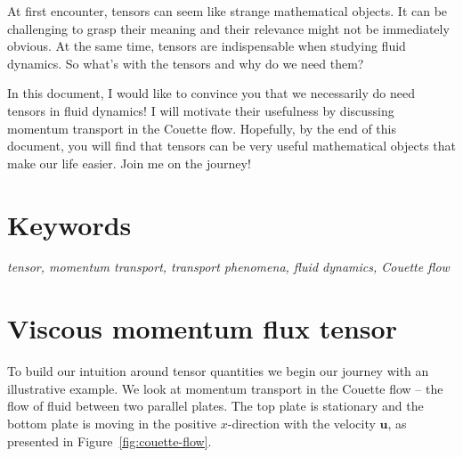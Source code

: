 \documentclass[10pt,twocolumn]{article}
\begin{document}
\small

At first encounter, tensors can seem like strange mathematical objects. It can be challenging to grasp their meaning and their relevance might not be immediately obvious. At the same time, tensors are indispensable when studying fluid dynamics. So what's with the tensors and why do we need them?

In this document, I would like to convince you that we necessarily do need tensors in fluid dynamics! I will motivate their usefulness by discussing momentum transport in the Couette flow. Hopefully, by the end of this document, you will find that tensors can be very useful mathematical objects that make our life easier. Join me on the journey!

\section*{Keywords}

\textit{tensor, momentum transport, transport phenomena, fluid dynamics, Couette flow}


\section*{Viscous momentum flux tensor}

To build our intuition around tensor quantities we begin our journey with an illustrative example. We look at momentum transport in the Couette flow -- the flow of fluid between two parallel plates. The top plate is stationary and the bottom plate is moving in the positive $x$-direction with the velocity $\mathbf{u}$, as presented in Figure~\ref{fig:couette-flow}.
\end{document}
